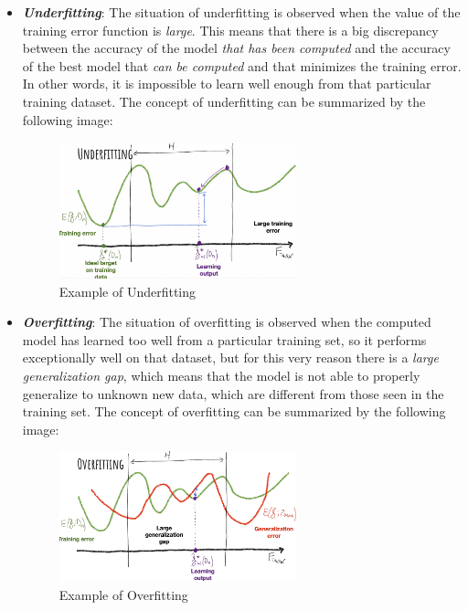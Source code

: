 \begin{itemize}
      \item \emph{\textbf{Underfitting}}: The situation of underfitting is observed
            when the value of the training error function is \emph{large}. This means
            that there is a big discrepancy between the accuracy of the model
            \emph{that has been computed} and the accuracy of the best model that
            \emph{can be computed} and that minimizes the training error. In other words,
            it is impossible to learn well enough from that particular training dataset.
            The concept of underfitting can be summarized by the following image:

            \begin{figure}[h]
                  \centering
                  \includegraphics[width=0.65\textwidth]{../img/Underfitting}
                  \caption{Example of Underfitting}
            \end{figure}

      \item \emph{\textbf{Overfitting}}: The situation of overfitting is observed
            when the computed model has learned too well from a particular
            training set, so it performs exceptionally well on that dataset, but for
            this very reason there is a \emph{large generalization gap},
            which means that the model is not able to properly generalize to unknown
            new data, which are different from those seen in the training set.
            The concept of overfitting can be summarized by the following image:

            \newpage

            \begin{figure}[h]
                  \centering
                  \includegraphics[width=0.65\textwidth]{../img/Overfitting}
                  \caption{Example of Overfitting}
            \end{figure}

\end{itemize}